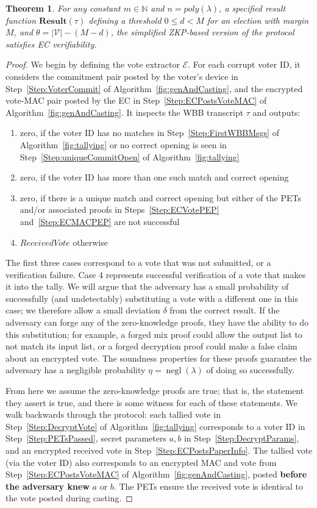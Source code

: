 \documentclass[12pt,a4paper]{article}
\DeclareMathOperator{\negl}{\text{negl}}
\newtheorem{theorem}{Theorem}
\theoremstyle{definition}
\newcommand{\ReceivedVote}{\mathit{ReceivedVote}}
\newcounter{protocol}
\begin{document}
\begin{theorem}
    For any constant $m\in\mathbb{N}$ and $n=poly(\lambda)$, a specified result function $\mathbf{Result}(\tau)$ defining a threshold $0 \leq d < M$ for an election with margin $M$, and $\theta=|\mathcal{V}|-(M-d)$, the simplified ZKP-based version of the protocol satisfies EC verifiability.
\end{theorem}
\begin{proof}
    We begin by defining the vote extractor $\mathcal{E}$. For each corrupt voter ID, it considers the commitment pair posted by the voter's device in Step~\ref{Step:VoterCommit} of Algorithm~\ref{fig:genAndCasting}, and the encrypted vote-MAC pair posted by the EC in Step~\ref{Step:ECPostsVoteMAC} of Algorithm~\ref{fig:genAndCasting}. It inspects the WBB transcript $\tau$ and outputs:
    \begin{enumerate}
        \item zero, if the voter ID has no matches in Step~\ref{Step:FirstWBBMsgs} of Algorithm~\ref{fig:tallying} or no correct opening is seen in Step~\ref{Step:uniqueCommitOpen} of Algorithm~\ref{fig:tallying}
        \item zero, if the voter ID has more than one such match and correct opening
        \item zero, if there is a unique match and correct opening but either of the PETs and/or associated proofs in Steps~\ref{Step:ECVotePEP} and~\ref{Step:ECMACPEP} are not successful
        \item $\ReceivedVote$ otherwise
    \end{enumerate}

    The first three cases correspond to a vote that was not submitted, or a verification failure. Case 4 represents successful verification of a vote that makes it into the tally. We will argue that the adversary has a small probability of successfully (and undetectably) substituting a vote with a different one in this case; we therefore allow a small deviation $\delta$ from the correct result. If the adversary can forge any of the zero-knowledge proofs, they have the ability to do this substitution; for example, a forged mix proof could allow the output list to not match its input list, or a forged decryption proof could make a false claim about an encrypted vote. The soundness properties for these proofs guarantee the adversary has a negligible probability $\eta=\negl(\lambda)$ of doing so successfully.

    From here we assume the zero-knowledge proofs are true; that is, the statement they assert is true, and there is some witness for each of these statements. We walk backwards through the protocol: each tallied vote in Step~\ref{Step:DecryptVote} of Algorithm~\ref{fig:tallying} corresponds to a voter ID in Step~\ref{Step:PETsPassed}, secret parameters $a, b$ in Step~\ref{Step:DecryptParams}, and an encrypted received vote in Step~\ref{Step:ECPostsPaperInfo}. The tallied vote (via the voter ID) also corresponds to an encrypted MAC and vote from Step~\ref{Step:ECPostsVoteMAC} of Algorithm~\ref{fig:genAndCasting}, posted \textbf{before the adversary knew} $a$ or $b$. The PETs ensure the received vote is identical to the vote posted during casting.


\end{proof}
\end{document}
